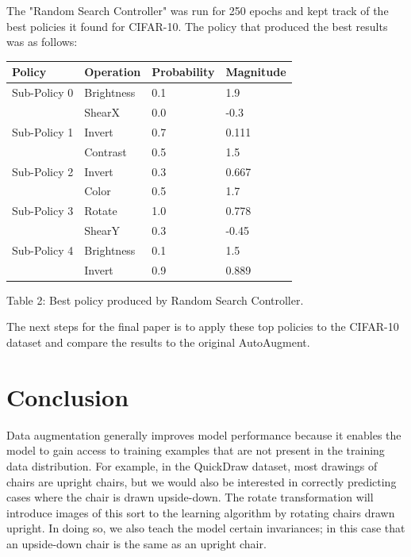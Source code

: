 \documentclass[10pt,twocolumn,letterpaper]{article}
\begin{document}
The "Random Search Controller" was run for 250 epochs and kept track of the best policies it found for CIFAR-10. The policy that produced the best results was as follows:

		\begin{table}[h]
			\begin{tabular}{llll}
				\hline
				Policy &Operation &Probability&Magnitude   \\ \hline
				Sub-Policy 0 &Brightness &0.1&1.9\\
				&ShearX &0.0 &-0.3\\

				Sub-Policy 1 &Invert &0.7&0.111\\
				&Contrast &0.5 &1.5\\

				Sub-Policy 2 &Invert &0.3&0.667\\
				&Color &0.5 &1.7\\

				Sub-Policy 3 &Rotate &1.0&0.778\\
				&ShearY &0.3 &-0.45\\

				Sub-Policy 4 &Brightness &0.1&1.5\\
				&Invert &0.9 &0.889\\
				\hline
			\end{tabular}
		\end{table}

Table 2: Best policy produced by Random Search Controller.

The next steps for the final paper is to apply these top policies to the CIFAR-10 dataset and compare the results to the original AutoAugment.



\section{Conclusion}

Data augmentation generally improves model performance because it enables the model to gain access to training examples that are not present in the training data distribution. For example, in the QuickDraw dataset, most drawings of chairs are upright chairs, but we would also be interested in correctly predicting cases where the chair is drawn upside-down. The rotate transformation will introduce images of this sort to the learning algorithm by rotating chairs drawn upright. In doing so, we also teach the model certain invariances; in this case that an upside-down chair is the same as an upright chair.
\end{document}
